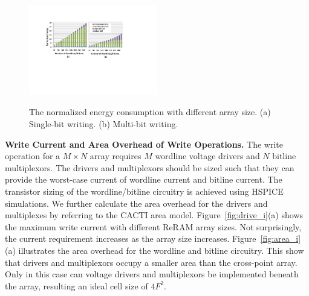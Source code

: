 \begin{figure}%
\centering
  \includegraphics[width=0.5\textwidth]{./figures/energy_f_tall2.pdf}\\
  \caption{The normalized energy consumption with different array size. (a) Single-bit writing. (b) Multi-bit writing.}\label{fig:energy}
    \vspace{-10pt}
\end{figure}

\vspace{5pt}\noindent\textbf{Write Current and Area Overhead of Write Operations.}
%
The write operation for a $M \times N$ array requires $M$ wordline voltage
drivers and $N$ bitline multiplexors. The drivers and multiplexors should be sized such that they can provide the worst-case current of wordline
current and bitline current. The transistor sizing of the wordline/bitline
circuitry is achieved using HSPICE simulations. We further calculate the
area overhead for the drivers and multiplexes by referring to the CACTI
area model. Figure~\ref{fig:drive_i}(a) shows the maximum write current
with different ReRAM array sizes. Not surprisingly, the current
requirement increases as the array size increases. Figure~\ref{fig:area_i}(a) illustrates the area overhead for the wordline and bitline circuitry. This show that drivers and multiplexors occupy a smaller area than the cross-point array. Only in this case can voltage drivers and multiplexors be implemented beneath the array, resulting an ideal cell size of $4F^2$.


